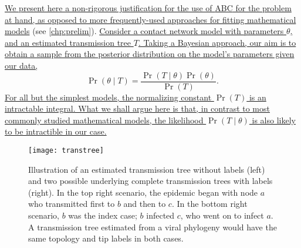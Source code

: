 {\color{blue}\uline{We present here a non-rigorous justification for the use of
\gls{ABC} for the problem at hand, as opposed to more frequently-used
approaches for fitting mathematical models} (see \cref{chp:prelim}).
\uline{Consider a contact network model with parameters $\theta$, and an
estimated transmission tree $T$. Taking a Bayesian approach, our aim is to
obtain a sample from the posterior distribution on the model's parameters given
our data,}
\[
    \Pr(\theta \mid T) = \frac{\Pr(T \mid \theta) \Pr(\theta)}{\Pr(T)}.
\]
\uline{For all but the simplest models, the normalizing constant $\Pr(T)$ is an
intractable integral. What we shall argue here is that, in contrast to most
commonly studied mathematical models, the likelihood $\Pr(T \mid \theta)$ is
also likely to be intractible in our case.}

\begin{figure}
    \centering
    \texttt{[image: transtree]}
    \caption[
        Illustration of an estimated transmission tree without labels and two
        possible underlying complete transmission trees with labels.
    ]{
        Illustration of an estimated transmission tree without labels (left)
        and two possible underlying complete transmission trees with labels
        (right). In the top right scenario, the epidemic began with node $a$
        who transmitted first to $b$ and then to $c$. In the bottom right
        scenario, $b$ was the index case; $b$ infected $c$, who went on to
        infect $a$. A transmission tree estimated from a viral phylogeny would
        have the same topology and tip labels in both cases.
    }
    \label{fig:tt}
\end{figure}

}
